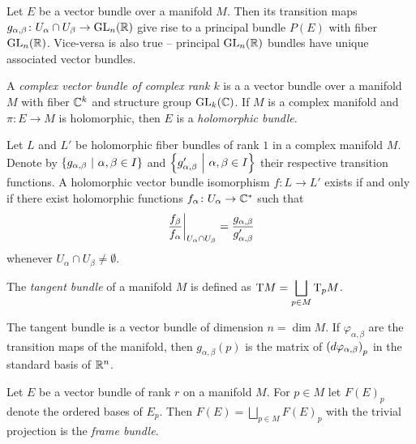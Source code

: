 \begin{zgled}
Let $E$ be a vector bundle over a manifold $M$. Then its transition
maps $g_{\alpha, \beta} \colon U_\alpha \cap U_\beta \to \operatorname{GL}_n(\mathbb{R})$
give rise to a principal bundle $P(E)$ with fiber $\operatorname{GL}_n(\mathbb{R})$.
Vice-versa is also true -- principal $\operatorname{GL}_n(\mathbb{R})$ bundles have
unique associated vector bundles.
\end{zgled}

\begin{definicija}
A
\emph{complex vector bundle of complex rank $k$}
is a a vector bundle over a manifold $M$ with fiber $\mathbb{C}^k$
and structure group $\operatorname{GL}_k(\mathbb{C})$. If $M$ is a complex manifold and
$\pi \colon E \to M$ is holomorphic, then $E$ is a
\emph{holomorphic bundle}.
\end{definicija}

\begin{trditev}
Let $L$ and $L'$ be holomorphic fiber bundles of rank $1$ in a
complex manifold $M$. Denote by
$\left\{g_{\alpha, \beta}~\middle\vert~\alpha, \beta \in I\right\}$ and
$\left\{g_{\alpha, \beta}'~\middle\vert~\alpha, \beta \in I\right\}$ their respective
transition functions. A holomorphic vector bundle isomorphism
$f \colon L \to L'$ exists if and only if there exist holomorphic
functions $f_\alpha \colon U_\alpha \to \mathbb{C}^*$ such that
\[
\left. \frac{f_\beta}{f_\alpha}\right|_{U_\alpha \cap U_\beta}^{} =
\frac{g_{\alpha, \beta}}{g_{\alpha, \beta}'}
\]
whenever $U_\alpha \cap U_\beta \ne \emptyset$.
\end{trditev}


\begin{definicija}
The \emph{tangent bundle} of a manifold $M$
is defined as
$\displaystyle \operatorname{T} \! M = \bigsqcup_{p \in M} \operatorname{T}_p \! M$.
\end{definicija}

\begin{trditev}
The tangent bundle is a vector bundle of dimension $n = \dim M$. If
$\varphi_{\alpha, \beta}$ are the transition maps of the manifold,
then $g_{\alpha, \beta}(p)$ is the matrix of
$\left(d \varphi_{\alpha, \beta}\right)_p$ in the standard basis of $\mathbb{R}^n$.
\end{trditev}

\begin{definicija}
Let $E$ be a vector bundle of rank $r$ on a manifold $M$. For
$p \in M$ let $F(E)_p$ denote the ordered bases of $E_p$. Then
$\displaystyle F(E) = \bigsqcup_{p \in M} F(E)_p$ with the trivial
projection is the \emph{frame bundle}.
\end{definicija}

